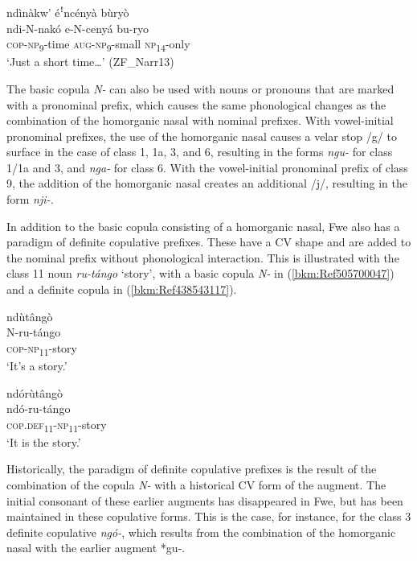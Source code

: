 \ea
\label{bkm:Ref492236057}
ndìnàkw’ éꜝncényà bùryò\\
\gll ndi-N-nakó    e-N-cenyá    bu-ryo\\
\textsc{cop}-\textsc{np}\textsubscript{9}-time  \textsc{aug}-\textsc{np}\textsubscript{9}-small  \textsc{np}\textsubscript{14}-only\\
\glt ‘Just a short time…’ (ZF\_Narr13)
\z

The basic copula \textit{N-} can also be used with nouns or pronouns that are marked with a pronominal prefix, which causes the same phonological changes as the combination of the homorganic nasal with nominal prefixes. With vowel-initial pronominal prefixes, the use of the homorganic nasal causes a velar stop /g/ to surface in the case of class 1, 1a, 3, and 6, resulting in the forms \textit{ngu-} for class 1/1a and 3, and \textit{nga-} for class 6. With the vowel-initial pronominal prefix of class 9, the addition of the homorganic nasal creates an additional /j/, resulting in the form \textit{nji-.}

In addition to the basic copula consisting of a homorganic nasal, Fwe also has a paradigm of definite copulative prefixes. These have a CV shape and are added to the nominal prefix without phonological interaction. This is illustrated with the class 11 noun \textit{ru-tángo} ‘story’, with a basic copula \textit{N-} in (\ref{bkm:Ref505700047}) and a definite copula in (\ref{bkm:Ref438543117}).

\ea
\label{bkm:Ref505700047}
\glll ndùtângò\\
N-ru-tángo\\
\textsc{cop}-\textsc{np}\textsubscript{11}-story\\
\glt ‘It’s a story.’
\z

\ea
\label{bkm:Ref438543117}
\glll ndórùtângò\\
ndó-ru-tángo\\
\textsc{cop}.\textsc{def}\textsubscript{11}-\textsc{np}\textsubscript{11}-story\\
\glt ‘It is the story.’
\z

Historically, the paradigm of definite copulative prefixes is the result of the combination of the copula \textit{N-} with a historical CV form of the augment. The initial consonant of these earlier augments has disappeared in Fwe, but has been maintained in these copulative forms. This is the case, for instance, for the class 3 definite copulative \textit{ngó-}, which results from the combination of the homorganic nasal with the earlier augment *gu\nobreakdash-.

